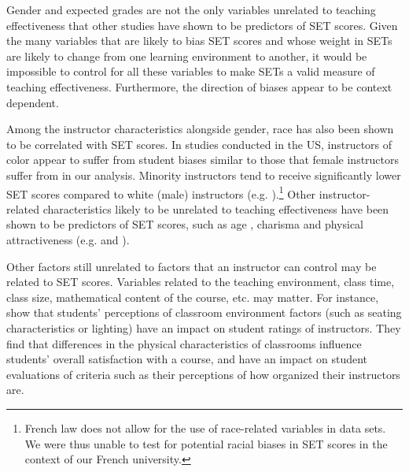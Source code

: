 \documentclass[12pt]{article}
\begin{document}
Gender and expected grades are not the only variables unrelated to teaching effectiveness that other studies have shown to be predictors of SET scores. Given the many variables that are likely to bias SET scores and whose weight in SETs are likely to change from one learning environment to another, it would be impossible to control for all these variables to make SETs a valid measure of teaching effectiveness. Furthermore, the direction of biases appear to be context dependent. 

Among the instructor characteristics alongside gender, race has also been shown to be correlated with SET scores.  In studies conducted in the US, instructors of color appear to suffer from student biases similar to those that female instructors suffer from in our analysis. Minority instructors tend to receive significantly lower SET scores compared to white (male) instructors (e.g. \citet{Merritt2008}).\footnote{French law does not allow for the use of race-related variables in data sets. We were thus unable to test for potential racial biases in SET scores in the context of our French university.} Other instructor-related characteristics likely to be unrelated to teaching effectiveness have been shown to be predictors of SET scores, such as age \citep{Arbuckle2003}, charisma \citep{Shevlin2000} and physical attractiveness (e.g. \citet{Riniolo2006} and \citet{Hamermesh2005}).  

Other factors still unrelated to factors that an instructor can control may be related to SET scores.  Variables related to the teaching environment, class time, class size, mathematical content of the course, etc. may matter. For instance, \citet{Hill2010} show that students' perceptions of classroom environment factors (such as seating characteristics or lighting) have an impact on student ratings of instructors. They find that differences in the physical characteristics of classrooms influence students' overall satisfaction with a course, and have an impact on student evaluations of criteria such as their perceptions of how organized their instructors are.
\end{document}
